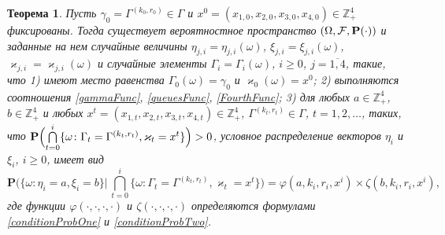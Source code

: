 \documentclass[a4paper,twoside]{article}
\theoremstyle{theorem}
\newtheorem{theorem}{Теорема}
\theoremstyle{remark}
\renewcommand{\Pr}{{\mathbf P}}
\begin{document}
\begin{theorem}
Пусть $\gamma_0=\Gamma^{(k_0,r_0)}\in \Gamma$ и $x^0=(x_{1,0},x_{2,0}, x_{3,0},x_{4,0})\in \mathbb{Z}_+^4$ фиксированы.
Тогда существует вероятностное пространство $(\Omega, {\cal F}, \Pr(\cdot))$ и заданные на нем случайные величины $\eta_{j,i}=\eta_{j,i}(\omega)$, $\xi_{j,i}=\xi_{j,i}(\omega)$, 	 $\varkappa_{j,i}=\varkappa_{j,i}(\omega)$ и случайные элементы $\Gamma_i=\Gamma_i(\omega)$, $i\geqslant 0$, $j= \overline{1,4}$, такие, что 1) имеют место равенства $\Gamma_0(\omega) = \gamma_0$ и $\varkappa_0(\omega)=x^0$; 2) выполняются соотношения \eqref{gammaFunc}, \eqref{queuesFunc}, \eqref{FourthFunc}; 3) для любых  $a\in \mathbb{Z}_+^4$, $b\in \mathbb{Z}_+^4$ и любых $x^t=(x_{1,t},x_{2,t},x_{3,t},x_{4,t}) \in \mathbb{Z}_+^4$, $\Gamma^{(k_t,r_t)} \in \Gamma$, $t = 1, 2, \ldots$, таких, что $\Pr\Bigl(\bigcap\limits_{t=0}^{i}\{\omega\colon \Gamma_t=\Gamma^{(k_t,r_t)}, \varkappa_t=x^t\}\Bigr)>0$, условное распределение векторов $\eta_i$ и $\xi_i$, $i \geqslant 0$,  имеет вид
\begin{equation}
\Pr \biggl(\{ \omega \colon \eta_i = a, \xi_i=b\} \bigg
|\,\bigcap_{t=0}^{i}\{\omega\colon \Gamma_t=\Gamma^{(k_t,r_t)}, \varkappa_t=x^t\}\biggr)=
\varphi(a,k_i,r_i,x^i)\times \zeta(b,k_i,r_i,x^i),
\label{ProbablititiesToProve}
\end{equation}
где функции $\varphi(\cdot, \cdot, \cdot, \cdot)$ и $\zeta(\cdot, \cdot, \cdot, \cdot)$ определяются формулами \eqref{conditionProbOne} и \eqref{conditionProbTwo}.

\label{myTheorem}
\end{theorem}
\end{document}
